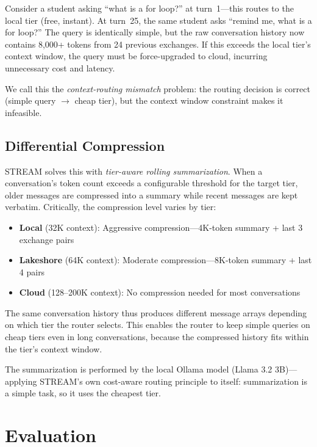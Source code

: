 \documentclass[manuscript, review]{acmart}
\begin{document}
Consider a student asking ``what is a for loop?'' at turn~1---this routes to the local tier (free, instant). At turn~25, the same student asks ``remind me, what is a for loop?'' The query is identically simple, but the raw conversation history now contains 8,000+ tokens from 24 previous exchanges. If this exceeds the local tier's context window, the query must be force-upgraded to cloud, incurring unnecessary cost and latency.

We call this the \textit{context-routing mismatch} problem: the routing decision is correct (simple query $\rightarrow$ cheap tier), but the context window constraint makes it infeasible.

\subsection{Differential Compression}

STREAM solves this with \textit{tier-aware rolling summarization}. When a conversation's token count exceeds a configurable threshold for the target tier, older messages are compressed into a summary while recent messages are kept verbatim. Critically, the compression level varies by tier:

\begin{itemize}
    \item \textbf{Local} (32K context): Aggressive compression---4K-token summary + last 3 exchange pairs
    \item \textbf{Lakeshore} (64K context): Moderate compression---8K-token summary + last 4 pairs
    \item \textbf{Cloud} (128--200K context): No compression needed for most conversations
\end{itemize}

The same conversation history thus produces different message arrays depending on which tier the router selects. This enables the router to keep simple queries on cheap tiers even in long conversations, because the compressed history fits within the tier's context window.

The summarization is performed by the local Ollama model (Llama 3.2 3B)---applying STREAM's own cost-aware routing principle to itself: summarization is a simple task, so it uses the cheapest tier.


\section{Evaluation}
\label{sec:evaluation}
\end{document}

